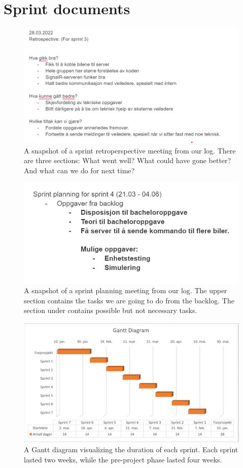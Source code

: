 \chapter{Sprint documents}
\begin{figure}[h!]
	\centering
	\includegraphics[width=1\linewidth]{figures/sprint_retroperspective}
	\caption[Sprint retroperspective]{A snapshot of a sprint retroperspective meeting from our log. There are three sections: What went well? What could have gone better? And what can we do for next time?}
	\label{fig:sprintretroperspective}
\end{figure}

\begin{figure}[h!]
	\centering
	\includegraphics[width=1\linewidth]{figures/sprint_planning}
	\caption[Sprint planning]{A snapshot of a sprint planning meeting from our log. The upper section contains the tasks we are going to do from the backlog. The section under contains possible but not necessary tasks.}
	\label{fig:sprintplanning}
\end{figure}

\begin{figure}[h!]
	\centering
	\includegraphics[width=1\linewidth]{figures/gantt}
	\caption[Sprint planning]{A Gantt diagram visualizing the duration of each sprint. Each sprint lasted two weeks, while the pre-project phase lasted four weeks.}
	\label{fig:gantt}
\end{figure}